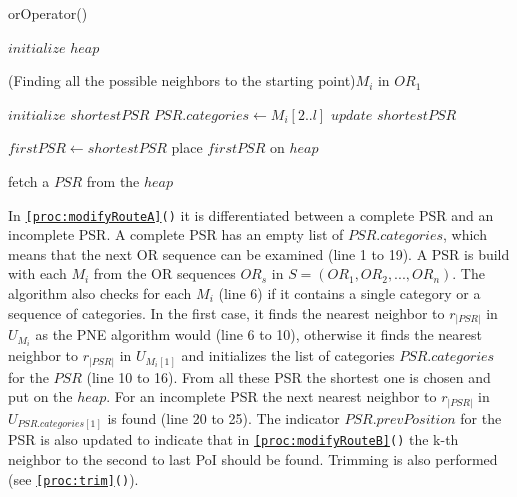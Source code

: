 \begin{algorithm}[H]
\caption{orOperator()}
\label{alg:or}
	
	
	\BlankLine
	
	$initialize$ $heap$\; 
	
	\ForEach(Finding all the possible neighbors to the starting point){$M_i$ in $OR_1$}{
		$initialize$ $shortestPSR$\;
		{
			\;
			$PSR.categories \leftarrow M_i[2..l]$\;
			$update$ $shortestPSR$\;
		}	
		
	}
	$firstPSR \leftarrow shortestPSR$\;
	place $firstPSR$ on $heap$\;
	
	\BlankLine
	
	
	fetch a $PSR$ from the $heap$\;

\end{algorithm}

In \texttt{\ref{proc:modifyRouteA}()} it is differentiated between a complete PSR and an incomplete PSR. 
A complete PSR has an empty list of $PSR.categories$, which means that the next OR sequence can be examined (line 1 to 19). A PSR is build with each $M_i$ from the OR sequences $OR_s$ in $S = (OR_1, OR_2, ..., OR_n)$. The algorithm also checks for each $M_i$ (line 6) if it contains a single category or a sequence of categories. In the first case, it finds the nearest neighbor to $r_{|PSR|}$ in $U_{M_{i}}$ as the PNE algorithm would (line 6 to 10), otherwise it finds the nearest neighbor to $r_{|PSR|}$ in $U_{M_i[1]}$ and initializes the list of categories $PSR.categories$ for the $PSR$ (line 10 to 16). From all these PSR the shortest one is chosen and put on the $heap$.
For an incomplete PSR the next nearest neighbor to $r_{|PSR|}$ in $U_{PSR.categories[1]}$ is found (line 20 to 25). The indicator $PSR.prevPosition$ for the PSR is also updated to indicate that in \texttt{\ref{proc:modifyRouteB}()} the k-th neighbor to the second to last PoI should be found.
Trimming is also performed (see \texttt{\ref{proc:trim}()}). \newline

